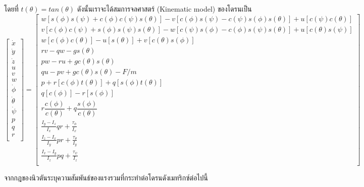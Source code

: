 โดยที่ $t(\theta) = tan(\theta)$ ดังนั้นเราจะได้สมการจลศาสตร์ (Kinematic model) ของโดรนเป็น
\begin{equation}
	{\begin{bmatrix}
		\dot{x}  \\
		\dot{y}  \\
		\dot{z} \\
		u\\
		v\\
		w\\
		\dot{\phi} \\
		\dot{\theta} \\
		\dot{\psi} \\
		p\\
		q\\
		r\\
		\end{bmatrix} = 
		\begin{bmatrix}
			w[s(\phi)s(\psi)+c(\phi)c(\psi)s(\theta)]-v[c(\phi)s(\psi)-c(\psi)s(\phi)s(\theta)]+u[c(\psi)c(\theta)] \\
			v[c(\phi)c(\psi)+s(\phi)s(\psi)s(\theta)]-w[c(\psi)s(\phi)-c(\phi)s(\psi)s(\theta)]+u[c(\theta)s(\psi)] \\
			w[c(\phi)c(\theta)]-u[s(\theta)]+v[c(\theta)s(\phi)]                                                    \\
			rv-qw-gs(\theta)\\
			pw-ru+gc(\theta)s(\theta)\\
			qu-pv+gc(\theta)s(\theta)-F/m\\
			p+r[c(\phi)t(\theta)]+q[s(\phi)t(\theta)]                                                               \\
			q[c(\phi)]-r[s(\phi)]                                                                                   \\
			r\dfrac{c(\phi)}{c(\theta)}+q\dfrac{s(\phi)}{c(\theta)}                                                 \\
			\frac{I_y-I_z}{I_x}qr+\frac{\tau_\phi}{I_x}\\
			\frac{I_z-I_x}{I_y}pr+\frac{\tau_\theta}{I_y}\\
			\frac{I_x-I_y}{I_z}pq+\frac{\tau_\psi}{I_z}\\
		\end{bmatrix}	}
	\label{equ:kinematic model}
\end{equation}

จากกฎของนิวตันระบุความสัมพันธ์ของแรงรวมที่กระทำต่อโดรนดังเมทริกซ์ต่อไปนี้

